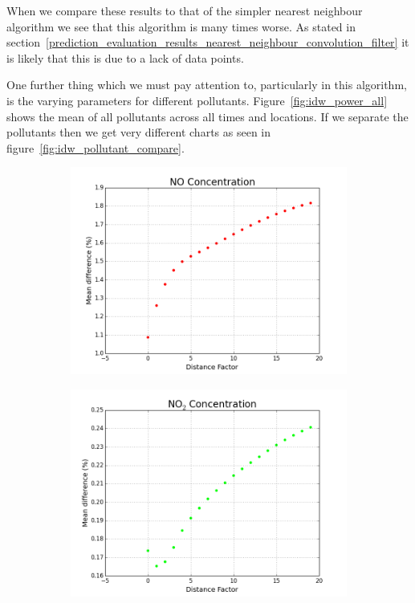 			When we compare these results to that of the simpler nearest neighbour algorithm we see that this algorithm is many times worse. As stated in section~\ref{prediction_evaluation_results_nearest_neighbour_convolution_filter} it is likely that this is due to a lack of data points. 

			One further thing which we must pay attention to, particularly in this algorithm, is the varying parameters for different pollutants. Figure~\ref{fig:idw_power_all} shows the mean of all pollutants across all times and locations. If we separate the pollutants then we get very different charts as seen in figure~\ref{fig:idw_pollutant_compare}.

			\begin{figure}[H]
                \centering
                \begin{subfigure}{0.6\textwidth}
                    \centering
                    \includegraphics[width=\linewidth]{./images/IDW_P_NO.png}
                    \caption{}
                    \label{fig:idw_power_NO}
                \end{subfigure}
                \begin{subfigure}{0.6\textwidth}
                    \includegraphics[width=\linewidth]{./images/IDW_P_NO2.png}

\end{subfigure}
\end{figure}
